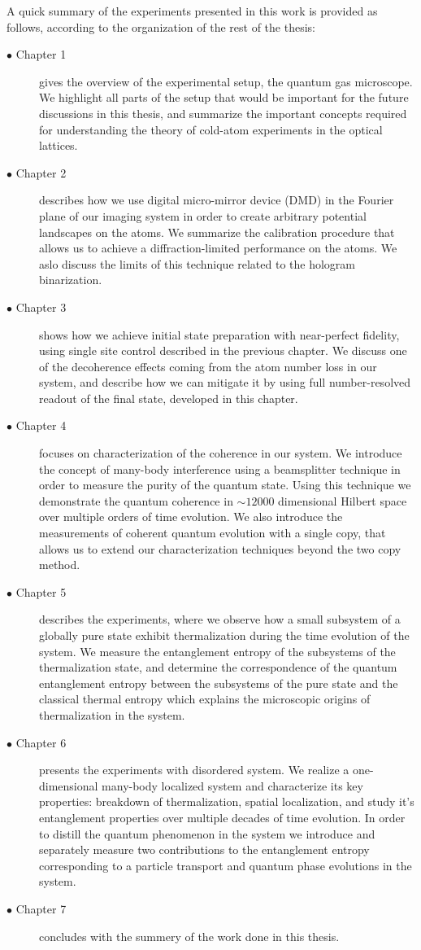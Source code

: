 A quick summary of the experiments presented in this work is provided as follows, according to the organization of the rest of the thesis:
\begin{description}
	\item[$\bullet$ Chapter 1] gives the overview of the experimental setup, the quantum gas microscope. We highlight all parts of the setup that would be important for the future discussions in this thesis, and summarize the important concepts required for understanding the theory of cold-atom experiments in the optical lattices.
	\item[$\bullet$ Chapter 2] describes how we use digital micro-mirror device (DMD) in the Fourier plane of our imaging system in order to create arbitrary potential landscapes on the atoms. We summarize the calibration procedure that allows us to achieve a diffraction-limited performance on the atoms. We aslo discuss the limits of this technique related to the hologram binarization.
	\item[$\bullet$ Chapter 3] shows how we achieve initial state preparation with near-perfect fidelity, using single site control described in the previous chapter. We discuss one of the decoherence effects coming from the atom number loss in our system, and describe how we can mitigate it by using full number-resolved readout of the final state, developed in this chapter.
	\item[$\bullet$ Chapter 4] focuses on characterization of the coherence in our system. We introduce the concept of many-body interference using a beamsplitter technique in order to measure the purity of the quantum state. Using this technique we demonstrate the quantum coherence in $\sim12000$ dimensional Hilbert space over multiple orders of time evolution. We also introduce the measurements of coherent quantum evolution with a single copy, that allows us to extend our characterization techniques beyond the two copy method. 
	\item[$\bullet$ Chapter 5] describes the experiments, where we observe how a small subsystem of a globally pure state exhibit thermalization during the time evolution of the system. We measure the entanglement entropy of the subsystems of the thermalization state, and determine the correspondence of the quantum entanglement entropy between the subsystems of the pure state and the classical thermal entropy%
	 which explains the microscopic origins of thermalization in the system.
	\item[$\bullet$ Chapter 6] presents the experiments with disordered system. We realize a one-dimensional many-body localized system and characterize its key properties: breakdown of thermalization, spatial localization, and study it's entanglement properties over multiple decades of time evolution. In order to distill the quantum phenomenon in the system we introduce and separately measure two contributions to the entanglement entropy corresponding to a particle transport and quantum phase evolutions in the system.
	 \item[$\bullet$ Chapter 7] concludes with the summery of the work done in this thesis.
\end{description}